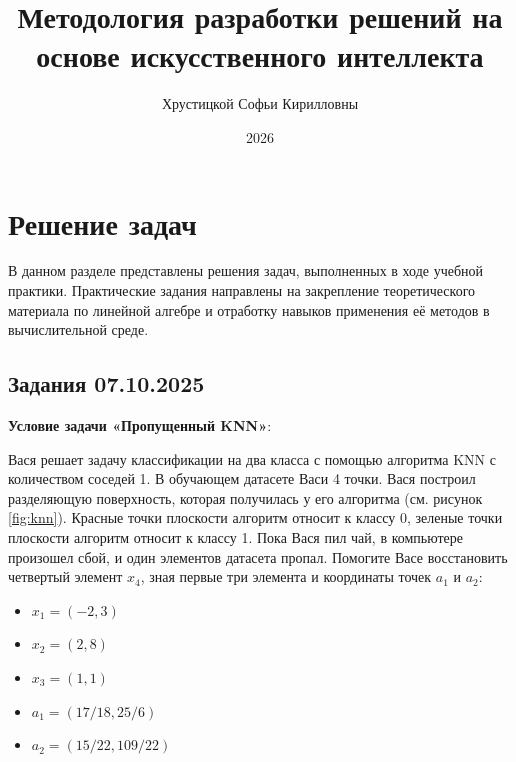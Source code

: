 \documentclass[pract]{SCWorks}
\begin{document}
    \studentfemale



    \title{Методология разработки решений на основе искусственного интеллекта}



    \author{Хрустицкой Софьи Кирилловны}



    \date{2026}

    \newpage

    \maketitle
    \secNumbering
    \tableofcontents

    \section{Решение задач}
    В данном разделе представлены решения задач, выполненных в ходе учебной практики.
    Практические задания направлены на закрепление теоретического материала по линейной алгебре и отработку навыков применения её методов в вычислительной среде.
    
    \subsection{Задания 07.10.2025}
    \textbf{Условие задачи «Пропущенный KNN»}:

    Вася решает задачу классификации на два класса с помощью алгоритма KNN с количеством соседей 1.
    В обучающем датасете Васи 4 точки.
    Вася построил разделяющую поверхность, которая получилась у его алгоритма (см. рисунок \ref{fig:knn}).
    Красные точки плоскости алгоритм относит к классу 0, зеленые точки плоскости алгоритм относит к классу 1.
    Пока Вася пил чай, в компьютере произошел сбой, и один элементов датасета пропал.
    Помогите Васе восстановить четвертый элемент $x_4$, зная первые три элемента и координаты точек $a_1$ и $a_2$:
    \begin{itemize}
        \item[$\bullet$] $x_1 = (-2, 3)$
        \item[$\bullet$] $x_2 = (2, 8)$
        \item[$\bullet$] $x_3 = (1, 1)$
        \item[$\bullet$] $a_1 = (17/18, 25/6)$
        \item[$\bullet$] $a_2 = (15/22, 109/22)$
    \end{itemize}
\end{document}

